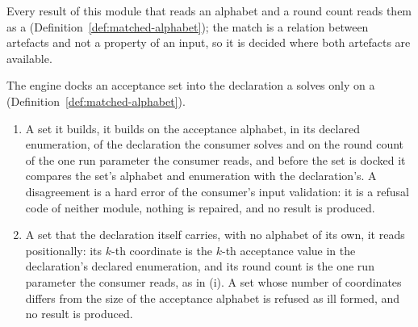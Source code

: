 
Every result of this module that reads an alphabet and a round count reads
them as a 
(Definition~\ref{def:matched-alphabet}); the match is a relation between
artefacts and not a property of an input, so it is decided where both
artefacts are available.

\begin{requirement}\label{req:matched-alphabet}
The engine docks an acceptance set into the declaration a 
solves only on a 
(Definition~\ref{def:matched-alphabet}).
\begin{enumerate}[label=(\roman*),leftmargin=2.2em]
\item A set it builds, it builds on the acceptance alphabet, in its declared
  enumeration, of the declaration the consumer solves and on the round count
  of the one run parameter the consumer reads, and before the set is docked
  it compares the set's alphabet and enumeration with the declaration's. A
  disagreement is a hard error of the consumer's input validation: it is a
  refusal code of neither module, nothing is repaired, and no result is
  produced.
\item A set that the declaration itself carries, with no alphabet of its
  own, it reads positionally: its $k$-th coordinate is the $k$-th acceptance
  value in the declaration's declared enumeration, and its round count is
  the one run parameter the consumer reads, as in (i). A set whose number of coordinates differs
  from the size of the acceptance alphabet is refused as ill formed, and no
  result is produced.
\end{enumerate}
\end{requirement}
